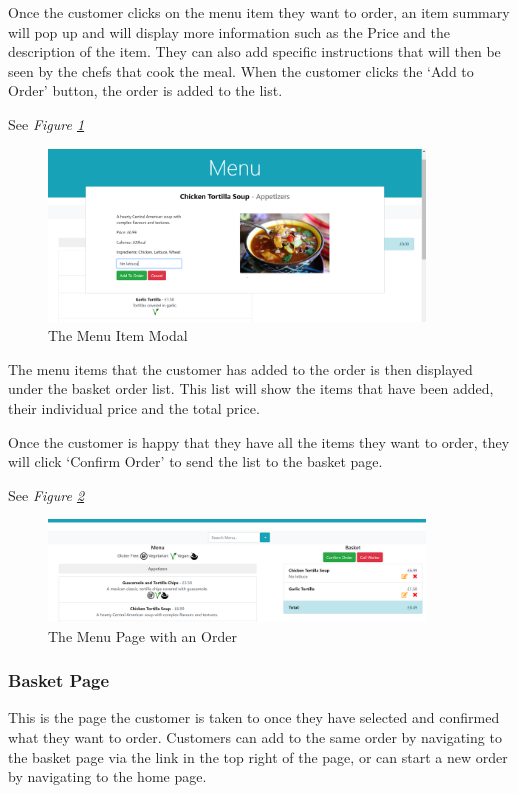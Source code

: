 \documentclass[12pt, twoside, a4paper]{report}
\begin{document}
Once the customer clicks on the menu item they want to order, an item summary will pop up and will display more information such as the Price and the description of the item.
They can also add specific instructions that will then be seen by the chefs that cook the meal.
When the customer clicks the ‘Add to Order’ button, the order is added to the list.

See \textit{Figure \ref{fig:menuItem}}

\begin{figure}[H]
  \centering
  \includegraphics[width=10cm]{MenuItem.png}
  \caption{The Menu Item Modal}
  \label{fig:menuItem}
\end{figure}

The menu items that the customer has added to the order is then displayed under the basket order list.
This list will show the items that have been added, their individual price and the total price.

Once the customer is happy that they have all the items they want to order, they will click ‘Confirm Order’ to send the list to the basket page. 

See \textit{Figure \ref{fig:menuOrder}}

\begin{figure}[H]
  \centering
  \includegraphics[width=10cm]{MenuOrder.png}
  \caption{The Menu Page with an Order}
  \label{fig:menuOrder}
\end{figure}

\subsubsection*{Basket Page} 

This is the page the customer is taken to once they have selected and confirmed what they want to order.
Customers can add to the same order by navigating to the basket page via the link in the top right of the page, or can start a new order by navigating to the home page.
\end{document}
